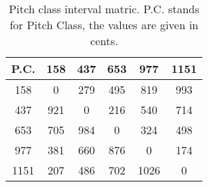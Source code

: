\begin{table}
\begin{tabular}{c||  c  c  c  c  c  }	
P.C. & 158 & 437 & 653 & 977 & 1151 \\
\hline
\hline
158 & 0 & 279 & 495 & 819 & 993\\
437 & 921 & 0 & 216 & 540 & 714\\
653 & 705 & 984 & 0 & 324 & 498\\
977 & 381 & 660 & 876 & 0 & 174\\
1151 & 207 & 486 & 702 & 1026 & 0     	
\end{tabular}
\label{tbl:pitch_class_interval_matrix}
\caption{Pitch class interval matric. P.C. stands for Pitch Class, the values are given in cents.}
\end{table}
